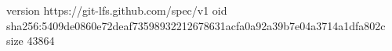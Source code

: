 version https://git-lfs.github.com/spec/v1
oid sha256:5409de0860e72deaf73598932212678631acfa0a92a39b7e04a3714a1dfa802c
size 43864
